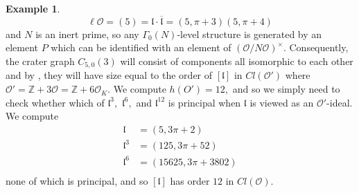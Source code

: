\documentclass[11pt,a4paper]{amsart}
\theoremstyle{plain}
\theoremstyle{definition}
\newtheorem{eg}[thm]{Example}
\theoremstyle{remark}
\begin{document}
\begin{eg}
  \[
    \ell\mathcal{O} = (5) = \mathfrak{l} \cdot \overline{\mathfrak{l}} = (5, \pi + 3)(5, \pi + 4)
  \]
  and $N$ is an inert prime, so any $\Gamma_0(N)$-level structure is generated by an element $P$ which can be identified with an element of $(\mathcal{O}/N\mathcal{O})^{\times}.$ Consequently, the crater graph $C_{5,0}(3)$ will consist of components all isomorphic to each other and by , they will have size equal to the order of $[\mathfrak{l}]$ in $Cl(\mathcal{O}')$ where $\mathcal{O}' = \mathbb{Z} + 3 \mathcal{O} = \mathbb{Z} + 6 \mathcal{O}_K.$ We compute $h(O') = 12,$ and so we simply need to check whether which of $\mathfrak{l}^3,$ $\mathfrak{l}^6,$ and $\mathfrak{l}^{12}$ is principal when $\mathfrak{l}$ is viewed as an $\mathcal{O}'$-ideal. We compute
  \begin{align*}
    \mathfrak{l} &= (5, 3\pi + 2) \\
    \mathfrak{l}^3 &= (125, 3\pi + 52) \\
    \mathfrak{l}^6 &= (15625, 3\pi + 3802) \\
  \end{align*}
  none of which is principal, and so $[\mathfrak{l}]$ has order $12$ in $Cl(\mathcal{O}).$
\end{eg}
\end{document}
